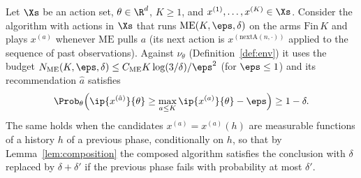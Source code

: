 \begin{corollary}\label{cor:median_elimination_linear}
\leanok
{}
Let $\Xs$ be an action set, $\theta\in\R^d$, $K\ge1$, and $x^{(1)},\dots,x^{(K)}\in\Xs$. Consider
the algorithm with actions in $\Xs$ that runs $\mathrm{ME}(K,\eps,\delta)$ on the arms
$\mathrm{Fin}\,K$ and plays $x^{(a)}$ whenever $\mathrm{ME}$ pulls $a$ (its next action is
$x^{(\mathrm{nextA}(n,\cdot))}$ applied to the sequence of past observations). Against
$\nu_\theta$ (Definition~\ref{def:env}) it uses the budget $N_{\mathrm{ME}}(K,\eps,\delta)\le C_{\mathrm{ME}}K\log(3/\delta)/\eps^2$
(for $\eps\le1$) and its recommendation $\hat a$ satisfies
\[
  \Prob_\theta\Big(\ip{x^{(\hat a)}}{\theta}\ge\max_{a\le K}\ip{x^{(a)}}{\theta}-\eps\Big)\ge1-\delta .
\]
The same holds when the candidates $x^{(a)} = x^{(a)}(h)$ are measurable functions of a history $h$
of a previous phase, conditionally on $h$, so that by Lemma~\ref{lem:composition} the composed
algorithm satisfies the conclusion with $\delta$ replaced by $\delta+\delta'$ if the previous
phase fails with probability at most $\delta'$.
\end{corollary}

